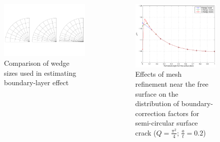 \begin{frame}
\begin{columns}
\begin{column}{0.45\textwidth}
\begin{figure}
\centering
	   \includegraphics[width=\columnwidth]{3_meshes}
      \caption{Comparison of wedge sizes used in estimating bound\-ary-layer effect}
      \label{fig:wedge_refinement}
\end{figure}
\end{column}
\begin{column}{0.45\textwidth}
\begin{figure}
\centering
	   \includegraphics[width=0.8\columnwidth]{nr_fig7}
      \caption{Effects of mesh refinement near the free surface on the distribution of bound\-ary-cor\-rec\-tion factors for semi-circu\-lar surface crack ($Q=\frac{\pi^2}{4}$; $\frac{a}{t}=0.2$)}
\end{figure}
\end{column}
\end{columns}
\end{frame}

